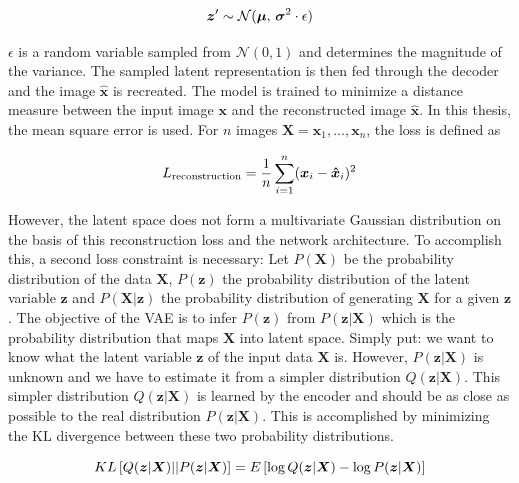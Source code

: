 \begin{equation}\eqlbl{hso_1}
	\boldsymbol{z}' \sim \mathcal{N}(\boldsymbol{\mu},\,\boldsymbol{\sigma}^{2} \cdot \epsilon)
\end{equation}

$\epsilon$ is a random variable sampled from  $\mathcal{N}(0, 1)$ and determines the magnitude of the variance. The sampled latent representation is then fed through the decoder and the image $\hat{\boldsymbol{x}}$ is recreated. The model is trained to minimize a distance measure between the input image $\boldsymbol{x}$ and the reconstructed image $\hat{\boldsymbol{x}}$. In this thesis, the mean square error is used. For $n$ images $\boldsymbol{X} = \boldsymbol{x}_1, ..., \boldsymbol{x}_n$, the loss is defined as

\begin{equation}\eqlbl{hso_2}
	L_{\text{reconstruction}} = \frac{1}{n} \sum_{i=1}^{n} (\boldsymbol{x}_i - \boldsymbol{\hat{x}}_i)^2
\end{equation}

However, the latent space does not form a multivariate Gaussian distribution on the basis of this reconstruction loss and the network architecture. To accomplish this, a second loss constraint is necessary: Let $P(\boldsymbol{X})$ be the probability distribution of the data $\boldsymbol{X}$, $P(\boldsymbol{z})$ the probability distribution of the latent variable $\boldsymbol{z}$ and $P(\boldsymbol{X}|\boldsymbol{z})$ the probability distribution of generating $\boldsymbol{X}$ for a given $\boldsymbol{z}$. The objective of the VAE is to infer $P(\boldsymbol{z})$ from $P(\boldsymbol{z}|\boldsymbol{X})$ which is the probability distribution that maps $\boldsymbol{X}$ into latent space. Simply put: we want to know what the latent variable $\boldsymbol{z}$ of the input data $\boldsymbol{X}$ is.
However, $P(\boldsymbol{z}|\boldsymbol{X})$ is unknown and we have to estimate it from a simpler distribution $Q(\boldsymbol{z}|\boldsymbol{X})$. This simpler distribution $Q(\boldsymbol{z}|\boldsymbol{X})$ is learned by the encoder and should be as close as possible to the real distribution $P(\boldsymbol{z}|\boldsymbol{X})$. This is accomplished by minimizing the KL divergence between these two probability distributions.

\begin{equation}\eqlbl{hso_3}
	KL \left[ Q(\boldsymbol{z}|\boldsymbol{X}) || P(\boldsymbol{z}|\boldsymbol{X}) \right] = E \left[ \log Q(\boldsymbol{z}|\boldsymbol{X}) - \log P(\boldsymbol{z}|\boldsymbol{X}) \right]
\end{equation}

